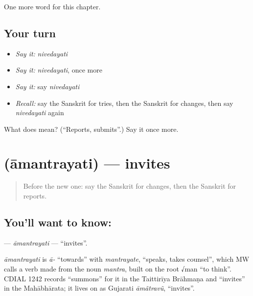 \begin{grammarlens}[title={What you've built}]
One more word for this chapter.
\end{grammarlens}

\subsection*{Your turn}
\begin{itemize}
\raggedright
  \item \emph{Say it:} \emph{nivedayati}
  \item \emph{Say it:} \emph{nivedayati}, once more
  \item \emph{Say it:} say \emph{nivedayati}
  \item \emph{Recall:} say the Sanskrit for tries, then the Sanskrit for changes, then say \emph{nivedayati} again
\end{itemize}

\begin{tcolorbox}[breakable,colback=teal!4,colframe=teal!35!black,title={Before you move on}]
What does  mean? (\textquotedblleft{}Reports, submits\textquotedblright{}.) Say it once more.
\end{tcolorbox}
\section[\texorpdfstring{\sk{आमन्त्रयति} (āmantrayati)}{आमन्त्रयति (āmantrayati)}]{ (āmantrayati) — invites}

\label{lesson:SA-C176-amantrayati}



\begin{quote}
Before the new one: say the Sanskrit for changes, then the Sanskrit for reports.
\end{quote}

\subsection*{You'll want to know: }
\textbf{} — \emph{āmantrayati} — \textquotedblleft{}invites\textquotedblright{}.

\begin{cousinweb}
\emph{āmantrayati} is \emph{ā-} \textquotedblleft{}towards\textquotedblright{} with \emph{mantrayate}, \textquotedblleft{}speaks, takes counsel\textquotedblright{}, which MW calls a verb made from the noun \emph{mantra}, built on the root √man \textquotedblleft{}to think\textquotedblright{}. CDIAL 1242 records \textquotedblleft{}summons\textquotedblright{} for it in the Taittirīya Brāhmaṇa and \textquotedblleft{}invites\textquotedblright{} in the Mahābhārata; it lives on as Gujarati \emph{āmãtravũ}, \textquotedblleft{}invites\textquotedblright{}.
\end{cousinweb}

